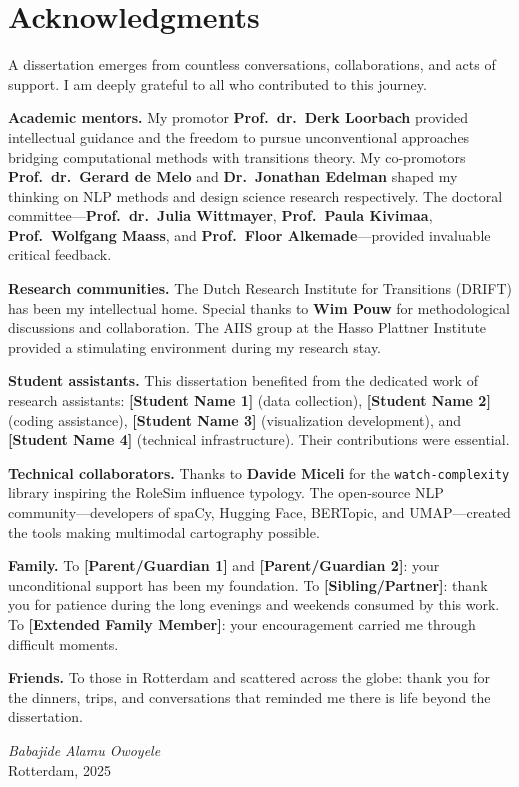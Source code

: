 \documentclass[../main.tex]{subfiles}
\begin{document}
\chapter*{Acknowledgments}

\vspace{0.3cm}

\noindent A dissertation emerges from countless conversations, collaborations, and acts of support. I am deeply grateful to all who contributed to this journey.

\textbf{Academic mentors.} My promotor \textbf{Prof.\ dr.\ Derk Loorbach} provided intellectual guidance and the freedom to pursue unconventional approaches bridging computational methods with transitions theory. My co-promotors \textbf{Prof.\ dr.\ Gerard de Melo} and \textbf{Dr.\ Jonathan Edelman} shaped my thinking on NLP methods and design science research respectively. The doctoral committee---\textbf{Prof.\ dr.\ Julia Wittmayer}, \textbf{Prof.\ Paula Kivimaa}, \textbf{Prof.\ Wolfgang Maass}, and \textbf{Prof.\ Floor Alkemade}---provided invaluable critical feedback.

\textbf{Research communities.} The Dutch Research Institute for Transitions (DRIFT) has been my intellectual home. Special thanks to \textbf{Wim Pouw} for methodological discussions and collaboration. The AIIS group at the Hasso Plattner Institute provided a stimulating environment during my research stay.

\textbf{Student assistants.} This dissertation benefited from the dedicated work of research assistants: \textbf{[Student Name 1]} (data collection), \textbf{[Student Name 2]} (coding assistance), \textbf{[Student Name 3]} (visualization development), and \textbf{[Student Name 4]} (technical infrastructure). Their contributions were essential.

\textbf{Technical collaborators.} Thanks to \textbf{Davide Miceli} for the \texttt{watch-complexity} library inspiring the RoleSim influence typology. The open-source NLP community---developers of spaCy, Hugging Face, BERTopic, and UMAP---created the tools making multimodal cartography possible.

\textbf{Family.} To \textbf{[Parent/Guardian 1]} and \textbf{[Parent/Guardian 2]}: your unconditional support has been my foundation. To \textbf{[Sibling/Partner]}: thank you for patience during the long evenings and weekends consumed by this work. To \textbf{[Extended Family Member]}: your encouragement carried me through difficult moments.

\textbf{Friends.} To those in Rotterdam and scattered across the globe: thank you for the dinners, trips, and conversations that reminded me there is life beyond the dissertation.

\vspace{0.5cm}

\begin{flushright}
\textit{Babajide Alamu Owoyele}\\
Rotterdam, 2025
\end{flushright}
\end{document}
